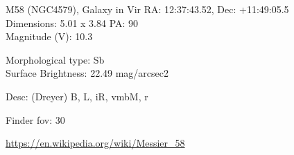 \begin{block}{M58 (NGC4579), Galaxy in Vir}
    RA: 12:37:43.52, Dec: +11:49:05.5 \\ 
    Dimensions: 5.01 x 3.84 PA: 90 \\ 
    Magnitude (V): 10.3

    Morphological type: Sb \\ 
    Surface Brightness: 22.49 mag/arcsec2 

    Desc: (Dreyer) B, L, iR, vmbM, r 

    Finder fov: 30 

    \url{https://en.wikipedia.org/wiki/Messier_58} 
\end{block}